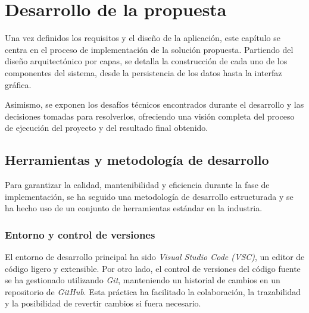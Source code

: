 \section{Desarrollo de la propuesta}
\label{section:desarrollo}

Una vez definidos los requisitos y el diseño de la aplicación, este capítulo se centra en el proceso de implementación de la solución propuesta.
Partiendo del diseño arquitectónico por capas, se detalla la construcción de cada uno de los componentes del sistema, desde la persistencia de los datos hasta la interfaz gráfica.

Asimismo, se exponen los desafíos técnicos encontrados durante el desarrollo y las decisiones tomadas para resolverlos, ofreciendo una visión completa del proceso de ejecución del proyecto y del resultado final obtenido.

\subsection{Herramientas y metodología de desarrollo}
\label{subsec:metodologia_desarrollo}
Para garantizar la calidad, mantenibilidad y eficiencia durante la fase de implementación, se ha seguido una metodología de desarrollo estructurada y se ha hecho uso de un conjunto de herramientas estándar en la industria.

\subsubsection{Entorno y control de versiones}
El entorno de desarrollo principal ha sido \textit{Visual Studio Code (VSC)}, un editor de código ligero y extensible. Por otro lado, el control de versiones del código fuente se ha gestionado utilizando \textit{Git}, manteniendo un historial de cambios en un repositorio de \textit{GitHub}. Esta práctica ha facilitado la colaboración, la trazabilidad y la posibilidad de revertir cambios si fuera necesario.

